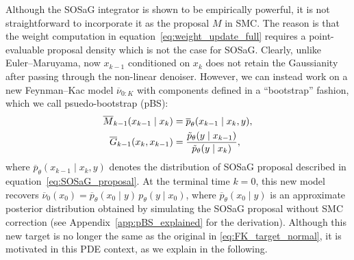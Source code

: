 Although the SOSaG integrator is shown to be empirically powerful, it is not straightforward to incorporate it as the proposal $M$ in SMC. 
The reason is that the weight computation in equation~\eqref{eq:weight_update_full} requires a point-evaluable proposal density which is not the case for SOSaG. 
Clearly, unlike Euler--Maruyama, now $x_{k-1}$ conditioned on $x_{k}$ does not retain the Gaussianity after passing through the non-linear denoiser.
However, we can instead work on a new Feynman--Kac model $\overline{\nu}_{0:K}$ with components defined in a ``bootstrap'' fashion, which we call psuedo-bootstrap (pBS):
%
\begin{equation*}
    \begin{split}
        \overline{M}_{k-1}(x_{k-1} \mid x_{k}) &= \overline{p}_\theta(x_{k-1} \mid x_{k}, y), \\
        \overline{G}_{k-1}(x_k, x_{k-1}) &= \frac{\Tilde{p}_{\theta}(y \mid x_{k-1})}{\Tilde{p}_{\theta}(y \mid x_{k})},
    \end{split}
\end{equation*}
%
where $\overline{p}_\theta(x_{k-1} \mid x_{k}, y)$ denotes the distribution of SOSaG proposal described in equation~\eqref{eq:SOSaG_proposal}. At the terminal time $k=0$, this new model recovers $\overline{\nu}_0(x_0) = \overline{p}_\theta(x_0 \mid y) \, p_{\theta}(y\mid x_0)$, where $\overline{p}_\theta(x_0 \mid y)$ is an approximate posterior distribution obtained by simulating the SOSaG proposal without SMC correction (see Appendix~\ref{app:pBS_explained} for the derivation). 
Although this new target is no longer the same as the original in \eqref{eq:FK_target_normal}, it is motivated in this PDE context, as we explain in the following. 

